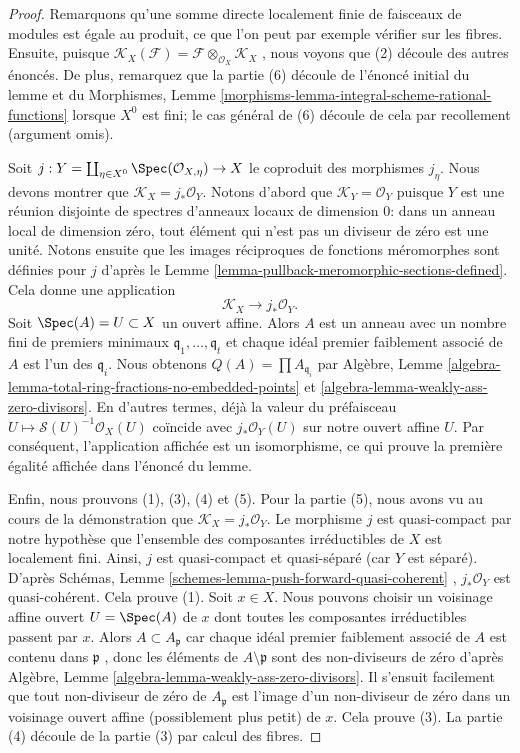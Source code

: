 \begin{proof}
Remarquons qu'une somme directe localement finie de faisceaux de modules est égale
au produit, ce que l'on peut par exemple vérifier sur les fibres. Ensuite,
puisque  $\mathcal{K}_X(\mathcal{F}) =
\mathcal{F} \otimes_{\mathcal{O}_X} \mathcal{K}_X$ , nous voyons que (2) découle des autres énoncés. De plus,
remarquez que la partie (6) découle de l'énoncé initial du lemme et du Morphismes,
Lemme  \ref{morphisms-lemma-integral-scheme-rational-functions}  lorsque  $X^0$  est fini; le cas général de (6) découle de
cela par recollement (argument omis).

\medskip\noindent
Soit  $j : Y = \coprod\nolimits_{\eta \in X^0} \Spec(\mathcal{O}_{X, \eta}) \to X$  le coproduit des morphismes  $j_\eta$. Nous devons montrer
que  $\mathcal{K}_X = j_*\mathcal{O}_Y$. Notons d'abord que  $\mathcal{K}_Y = \mathcal{O}_Y$  puisque  $Y$  est une
réunion disjointe de spectres d'anneaux locaux de dimension  $0$: dans un
anneau local de dimension zéro, tout élément qui n'est pas un diviseur de zéro est
une unité. Notons ensuite que les images réciproques de fonctions méromorphes sont
définies pour  $j$  d'après le Lemme  \ref{lemma-pullback-meromorphic-sections-defined}. Cela donne une
application
$$
\mathcal{K}_X \longrightarrow j_*\mathcal{O}_Y.
$$
Soit  $\Spec(A) = U \subset X$  un ouvert affine. Alors  $A$  est un anneau avec un
nombre fini de premiers minimaux  $\mathfrak q_1, \ldots, \mathfrak q_t$  et chaque idéal premier faiblement
associé de  $A$  est l'un des  $\mathfrak q_i$. Nous obtenons  $Q(A) = \prod A_{\mathfrak q_i}$  par
Algèbre, Lemme  \ref{algebra-lemma-total-ring-fractions-no-embedded-points}  et  \ref{algebra-lemma-weakly-ass-zero-divisors}. En d'autres termes, déjà la valeur du
préfaisceau  $U \mapsto \mathcal{S}(U)^{-1}\mathcal{O}_X(U)$  coïncide avec  $j_*\mathcal{O}_Y(U)$  sur notre ouvert affine
 $U$. Par conséquent, l'application affichée est un isomorphisme, ce qui
prouve la première égalité affichée dans l'énoncé du lemme.

\medskip\noindent
Enfin, nous prouvons (1), (3), (4) et (5). Pour la partie (5), nous avons vu au
cours de la démonstration que  $\mathcal{K}_X = j_*\mathcal{O}_Y$. Le morphisme  $j$  est
quasi-compact par notre hypothèse que l'ensemble des composantes irréductibles de
 $X$  est localement fini. Ainsi,  $j$  est quasi-compact et
quasi-séparé (car  $Y$  est séparé). D'après Schémas, Lemme  \ref{schemes-lemma-push-forward-quasi-coherent} ,
 $j_*\mathcal{O}_Y$  est quasi-cohérent. Cela prouve (1). Soit  $x \in X$. Nous pouvons
choisir un voisinage affine ouvert  $U = \Spec(A)$  de  $x$  dont toutes les
composantes irréductibles passent par  $x$. Alors  $A \subset A_\mathfrak p$  car chaque
idéal premier faiblement associé de  $A$  est contenu dans
 $\mathfrak p$ , donc les éléments de  $A \setminus \mathfrak p$  sont des non-diviseurs de zéro
d'après Algèbre, Lemme  \ref{algebra-lemma-weakly-ass-zero-divisors}. Il s'ensuit facilement que tout non-diviseur
de zéro de  $A_\mathfrak p$  est l'image d'un non-diviseur de zéro dans un voisinage
ouvert affine (possiblement plus petit) de  $x$. Cela prouve (3). La
partie (4) découle de la partie (3) par calcul des fibres.
\end{proof}

